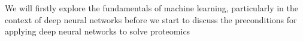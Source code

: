We will firstly explore the fundamentals of machine learning, particularly in the context of deep neural networks before we start to discuss the preconditions for applying deep neural networks to solve proteomics 